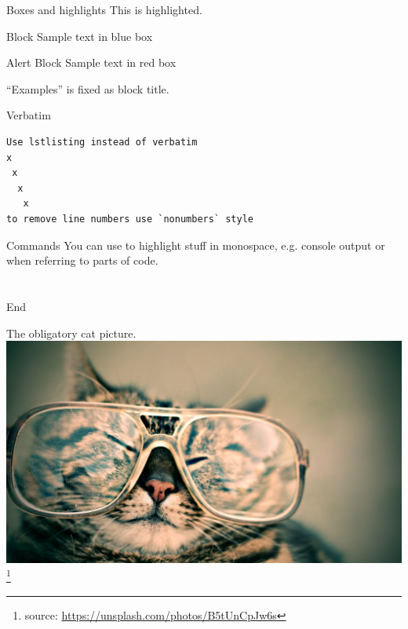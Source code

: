 \begin{frame}{Boxes and highlights}
This is \alert{highlighted}.
\begin{block}{Block}
Sample text in blue box
\end{block}
\begin{alertblock}{Alert Block}
Sample text in red box
\end{alertblock}
\begin{examples}
``Examples'' is fixed as block title.
\end{examples}
\end{frame}

\begin{frame}[fragile]{Verbatim}
\begin{lstlisting}[style=nonumbers]
Use lstlisting instead of verbatim
x
 x
  x
   x
to remove line numbers use `nonumbers` style
\end{lstlisting}
\end{frame}

\begin{frame}{Commands}
  You can use  to highlight stuff in monospace, e.g.
  console output or when referring to parts of code.
\end{frame}

\part{} %
\begin{frame}{End}
  \begin{center}
    The obligatory cat picture.\\
    \includegraphics[height=.7\textheight]{images/octavio-fossatti-37556.eps}
    \footnote[frame]{source:
    \href{https://unsplash.com/photos/B5tUnCpJw6s}
    {https://unsplash.com/photos/B5tUnCpJw6s}}
  \end{center}
\end{frame}


\appendix
